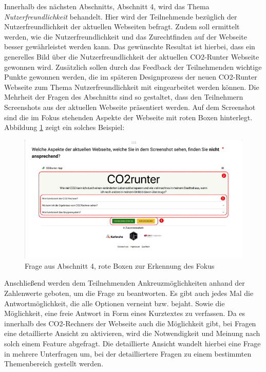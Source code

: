 Innerhalb des nächsten Abschnitts, Abschnitt 4, wird das Thema \textit{Nutzerfreundlichkeit} behandelt.
Hier wird der Teilnehmende bezüglich der Nutzerfreundlichkeit der aktuellen Webseiten befragt.
Zudem soll ermittelt werden, wie die Nutzerfreundlichkeit und das Zurechtfinden auf der Webseite besser gewährleistet werden kann.
Das gewünschte Resultat ist hierbei, dass ein generelles Bild über die Nutzerfreundlichkeit der aktuellen CO2-Runter Webseite gewonnen wird.
Zusätzlich sollen durch das Feedback der Teilnehmenden wichtige Punkte gewonnen werden, die im späteren Designprozess der neuen CO2-Runter Webseite zum Thema Nutzerfreundlichkeit mit eingearbeitet werden können.
Die Mehrheit der Fragen des Abschnitts sind so gestaltet, dass den Teilnehmern Screenshots aus der aktuellen Webseite präsentiert werden.
Auf dem Screenshot sind die im Fokus stehenden Aspekte der Webseite mit roten Boxen hinterlegt. Abbildung \ref{fig:picture-of-screenshot-with-boxes} zeigt ein solches Beispiel:

\begin{figure}[H]
    \centering
    \includegraphics[width=1\textwidth]{images/05/picture_of_screenshot_with_boxes}
    \caption{Frage aus Abschnitt 4, rote Boxen zur Erkennung des Fokus}
    \label{fig:picture-of-screenshot-with-boxes}
\end{figure}

Anschließend werden dem Teilnehmenden Ankreuzmöglichkeiten anhand der Zahlenwerte geboten, um die Frage zu beantworten.
Es gibt auch jedes Mal die Antwortmöglichkeit, die alle Optionen verneint bzw. bejaht.
Sowie die Möglichkeit, eine freie Antwort in Form eines Kurztextes zu verfassen.
Da es innerhalb des CO2-Rechners der Webseite auch die Möglichkeit gibt, bei Fragen eine detaillierte Ansicht zu aktivieren, wird die Notwendigkeit und Meinung nach solch einem Feature abgefragt.
Die detaillierte Ansicht wandelt hierbei eine Frage in mehrere Unterfragen um, bei der detailliertere Fragen zu einem bestimmten Themenbereich gestellt werden.\

